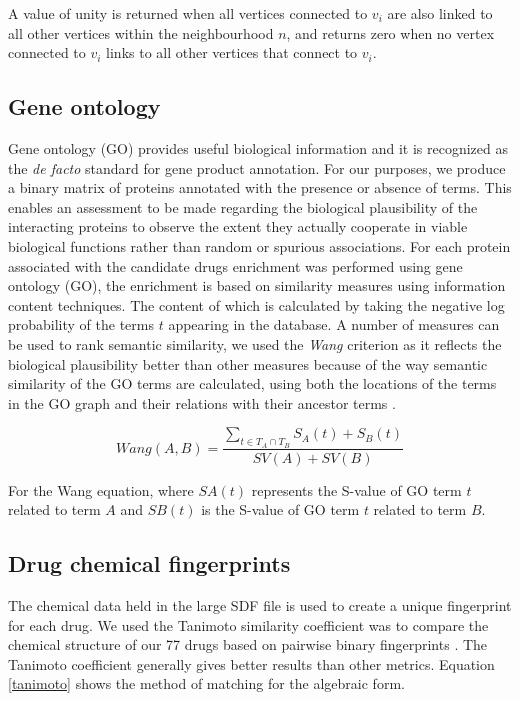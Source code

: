 \documentclass[preprint,11pt]{elsarticle}
\begin{document}
A value of unity is returned when all vertices connected to $v_i$ are also linked to all other vertices
within the neighbourhood $n$, and returns zero when no vertex connected to $v_i$ links to all other vertices that connect to $v_i$.  

\subsection{Gene ontology}
Gene ontology (GO) provides useful biological information and it is recognized as the {\it de facto} standard for gene product annotation. For our purposes, we produce a binary matrix of proteins annotated with the presence or absence of  terms. This enables an assessment to be made regarding the biological plausibility of the interacting proteins to observe the extent they actually cooperate in viable biological functions rather than random or spurious associations. For each protein associated with the candidate drugs enrichment was performed using gene ontology (GO), the enrichment is based on similarity measures using information content techniques. The content of which is calculated by taking the negative log probability of the terms $t$ appearing in the database. A number of measures can be used to rank semantic similarity, we used the {\it Wang} criterion as it reflects the biological plausibility better than other measures because of the way semantic similarity of the GO terms are calculated, using both the locations of the terms in the GO graph and their relations with their ancestor terms \cite{Wang2007}.

\begin{equation}
         Wang(A, B) = \frac{\displaystyle\sum_{t \in T_{A} \cap T_{B}}{S_{A}(t) + S_{B}(t)}}{SV(A) + SV(B)}
\label{goe}
\end{equation}

For the Wang equation, where $SA(t)$ represents the S-value of GO term $t$ related to term $A$ and $SB(t)$ is the S-value of GO term $t$ related to term $B$. 

\subsection{Drug chemical fingerprints}
The chemical data held in the large SDF file is used to create a unique fingerprint for each drug. We used the Tanimoto similarity coefficient was to compare the chemical structure of our 77 drugs based on pairwise binary fingerprints \cite{Chen2002}. The Tanimoto coefficient generally gives better results than other metrics. Equation \ref{tanimoto} shows the method of matching for the algebraic form.
\end{document}
